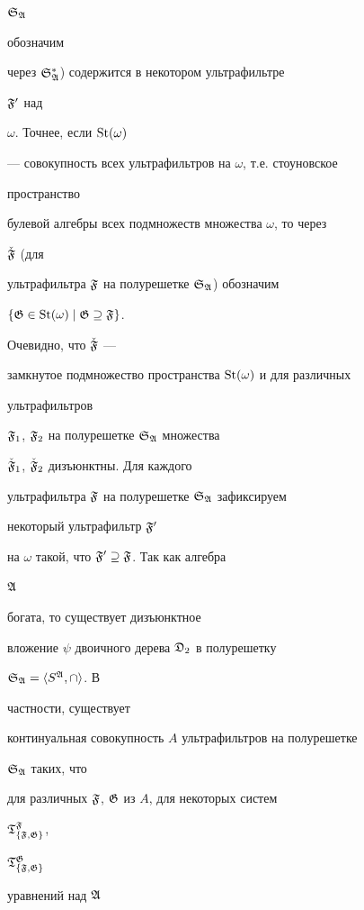 \begin{pf}
$\frak S_{\frak A}$


обозначим


через $\frak S^*_{\frak A}$) содержится в некотором ультрафильтре


$\frak F'$ над


$\omega$. Точнее, если $\operatorname{St}(\omega)$


--- совокупность всех ультрафильтров на $\omega$, т.е. стоуновское


пространство


булевой алгебры всех подмножеств множества $\omega$, то через


$\Check{\frak F}$ (для


ультрафильтра $\frak F$ на полурешетке $\frak S_{\frak A}$) обозначим


$\{\frak G\in\operatorname{St}(\omega)\mid\frak G\supseteq\frak F\}$.


Очевидно, что $\Check{\frak F}$ ---


замкнутое подмножество пространства $\operatorname{St}(\omega)$ и для различных


ультрафильтров


$\frak F_1$, $\frak F_2$ на полурешетке $\frak S_{\frak A}$ множества


$\Check{\frak F}_1$, $\Check{\frak F}_2$ дизъюнктны. Для каждого


ультрафильтра $\frak F$ на полурешетке $\frak S_{\frak A}$ зафиксируем


некоторый ультрафильтр $\frak F'$


на $\omega$ такой, что $\frak F'\supseteq\frak F$. Так как алгебра


$\frak A$


богата, то существует дизъюнктное


вложение $\psi$ двоичного дерева $\frak D_2$ в полурешетку


$\frak S_{\frak A}=\langle S^{\frak A},\cap\rangle$. В


частности, существует


континуальная совокупность $A$ ультрафильтров на полурешетке


$\frak S_{\frak A}$ таких, что


для различных $\frak F$, $\frak G$ из $A$, для некоторых систем


$\frak T^{\frak F}_{\{\frak F,\frak G\}}$,


$\frak T^{\frak G}_{\{\frak F,\frak G\}}$


уравнений над $\frak A$


$$



\end{pf}
